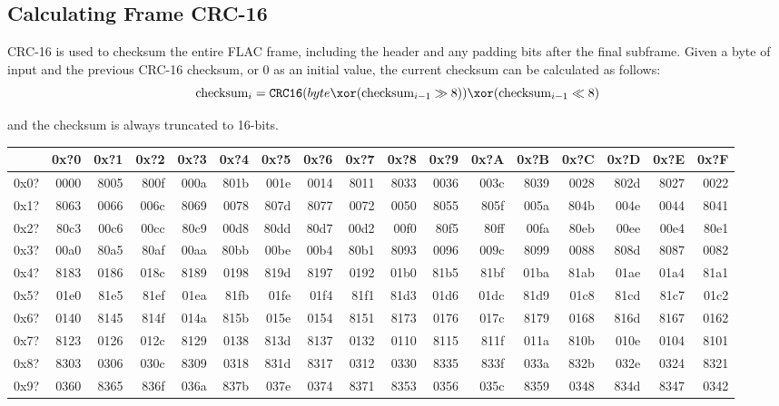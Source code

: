 \subsection{Calculating Frame CRC-16}
\label{flac:calculate_crc16}
CRC-16 is used to checksum the entire FLAC frame, including the header
and any padding bits after the final subframe.
Given a byte of input and the previous CRC-16 checksum,
or 0 as an initial value, the current checksum can be calculated as follows:
\begin{equation}
\text{checksum}_i = \texttt{CRC16}(byte\xor(\text{checksum}_{i - 1} \gg 8 ))\xor(\text{checksum}_{i - 1} \ll 8)
\end{equation}
\par
\noindent
and the checksum is always truncated to 16-bits.
\begin{table}[h]
{\ttfamily
\begin{tabular}{|r||r|r|r|r|r|r|r|r|r|r|r|r|r|r|r|r|}
\hline
 & 0x?0 & 0x?1 & 0x?2 & 0x?3 & 0x?4 & 0x?5 & 0x?6 & 0x?7 & 0x?8 & 0x?9 & 0x?A & 0x?B & 0x?C & 0x?D & 0x?E & 0x?F \\
\hline
0x0? & 0000 & 8005 & 800f & 000a & 801b & 001e & 0014 & 8011 & 8033 & 0036 & 003c & 8039 & 0028 & 802d & 8027 & 0022 \\
0x1? & 8063 & 0066 & 006c & 8069 & 0078 & 807d & 8077 & 0072 & 0050 & 8055 & 805f & 005a & 804b & 004e & 0044 & 8041 \\
0x2? & 80c3 & 00c6 & 00cc & 80c9 & 00d8 & 80dd & 80d7 & 00d2 & 00f0 & 80f5 & 80ff & 00fa & 80eb & 00ee & 00e4 & 80e1 \\
0x3? & 00a0 & 80a5 & 80af & 00aa & 80bb & 00be & 00b4 & 80b1 & 8093 & 0096 & 009c & 8099 & 0088 & 808d & 8087 & 0082 \\
0x4? & 8183 & 0186 & 018c & 8189 & 0198 & 819d & 8197 & 0192 & 01b0 & 81b5 & 81bf & 01ba & 81ab & 01ae & 01a4 & 81a1 \\
0x5? & 01e0 & 81e5 & 81ef & 01ea & 81fb & 01fe & 01f4 & 81f1 & 81d3 & 01d6 & 01dc & 81d9 & 01c8 & 81cd & 81c7 & 01c2 \\
0x6? & 0140 & 8145 & 814f & 014a & 815b & 015e & 0154 & 8151 & 8173 & 0176 & 017c & 8179 & 0168 & 816d & 8167 & 0162 \\
0x7? & 8123 & 0126 & 012c & 8129 & 0138 & 813d & 8137 & 0132 & 0110 & 8115 & 811f & 011a & 810b & 010e & 0104 & 8101 \\
0x8? & 8303 & 0306 & 030c & 8309 & 0318 & 831d & 8317 & 0312 & 0330 & 8335 & 833f & 033a & 832b & 032e & 0324 & 8321 \\
0x9? & 0360 & 8365 & 836f & 036a & 837b & 037e & 0374 & 8371 & 8353 & 0356 & 035c & 8359 & 0348 & 834d & 8347 & 0342 \\

\end{tabular}}
\end{table}
